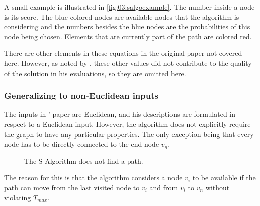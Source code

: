 A small example is illustrated in \cref{fig:03:salgoexample}.
The number inside a node is its score.
The blue-colored nodes are available nodes that the algorithm is considering and the numbers besides the blue nodes are the probabilities of this node being chosen.
Elements that are currently part of the path are colored red.

There are other elements in these equations in the original paper not covered here.
However, as noted by \citeauthor{tsiligiridis_heuristic_1984}, these other values did not contribute to the quality of the solution in his evaluations, so they are omitted here.

\subsubsection{Generalizing to non-Euclidean inputs}

The inputs in \citeauthor{tsiligiridis_heuristic_1984}' paper are Euclidean, and his descriptions are formulated in respect to a Euclidean input.
However, the algorithm does not explicitly require the graph to have any particular properties. The only exception being that every node has to be directly connected to the end node $v_n$.
\begin{wrapfigure}{l}{5.5cm}
	\centering
	\caption{The S-Algorithm does not find a path.}
	\label{fig:03:salgofailexample}
\end{wrapfigure}
The reason for this is that the algorithm considers a node $v_i$ to be available if the path can move from the last visited node to $v_i$ and from $v_i$ to $v_n$ without violating $T_{max}$.

